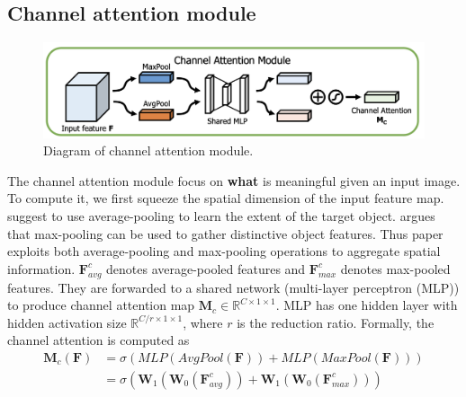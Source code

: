 \subsection{Channel attention module}
\begin{figure}[h!]
	\centering
	\includegraphics[width=\linewidth]{img/channel-attention-module}
	\caption{Diagram of channel attention module.\cite{CBAM}}
	\label{fig:channel-attention}
\end{figure}
The channel attention module focus on \textbf{what} is meaningful given an input image. To compute it, we first squeeze the \textcolor{BrickRed}{spatial dimension} of the input feature map. \cite{CAM} suggest to use average-pooling to learn the extent of the target object. \cite{CBAM} argues that max-pooling can be used to gather distinctive object features. Thus paper \cite{CBAM} exploits both average-pooling and max-pooling operations to aggregate spatial information.
$ \textbf{F}^c_{avg} $ denotes average-pooled features and $ \textbf{F}^c_{max} $ denotes max-pooled features. They are forwarded to a \textcolor{BrickRed}{shared network} (multi-layer perceptron (MLP)) to produce channel attention map $ \textbf{M}_c \in \mathbb{R}^{C\times 1\times 1} $. MLP has one hidden layer with hidden activation size $ \mathbb{R}^{C/r\times1\times1} $, where $ r $ is the reduction ratio.
Formally, the channel attention is computed as 
\begin{equation}
	\begin{split}
		\textbf{M}_c(\textbf{F}) &= \sigma(MLP(AvgPool(\textbf{F})) + MLP(MaxPool(\textbf{F})))\\
		&= \sigma(\textbf{W}_1(\textbf{W}_0(\textbf{F}_{avg}^c))+\textbf{W}_1(\textbf{W}_0(\textbf{F}^c_{max})))
	\end{split}
\end{equation} 


